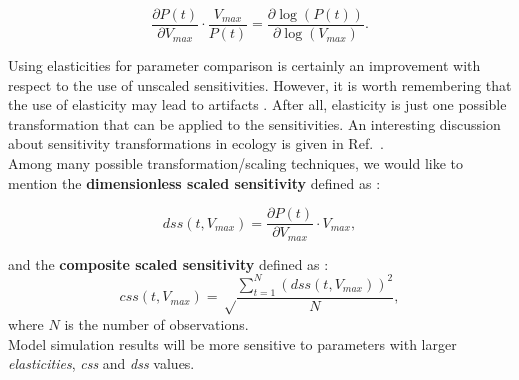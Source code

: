 \begin{equation}
\frac{\partial P(t)}{\partial V_{max}} \cdot \frac{V_{max}}{P(t)} = \frac{\partial \log(P(t))}{\partial\log(V_{max})}.
\end{equation}

Using elasticities for parameter comparison is certainly an improvement with respect to the use of unscaled sensitivities. However, it is worth remembering that the use of elasticity may lead to artifacts \cite{scale}. After all, elasticity is just one possible transformation that can be applied to the sensitivities. An interesting discussion about sensitivity transformations in ecology is given in Ref.~\cite{scale}. \\
Among many possible transformation/scaling techniques, we would like to mention the \textbf{dimensionless scaled sensitivity} defined as \cite{calib}:

\begin{equation}
dss(t, V_{max}) = \frac{\partial P(t)}{\partial V_{max}} \cdot V_{max},
\end{equation}

and the \textbf{composite scaled sensitivity} defined as \cite{calib}:
\begin{equation}
css(t,V_{max}) = \sqrt \frac{\sum_{t=1}^N \left(dss(t,V_{max})\right)^2}{N},
\end{equation}
where $N$ is the number of observations.\\
Model simulation results will be more sensitive to parameters with larger \textit{elasticities}, \textit{css} and \textit{dss} values.\\
%
%


